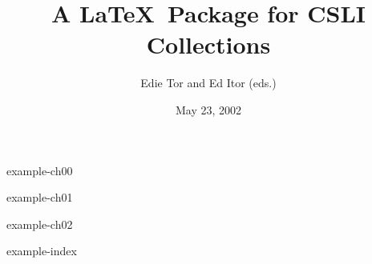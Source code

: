 \documentclass{book}
\title{A \LaTeX\ Package for CSLI Collections}    %
\author{Edie Tor and Ed Itor (eds.)}              %
\date{May 23, 2002}                               %
\begin{document}


\frontmatter      %


\maketitle                %

\setcounter{page}{5}
\setcounter{tocdepth}{0}  %
\tableofcontents          %

 {example-ch00}   %


\mainmatter       %


 {example-ch01}

 {example-ch02}


\backmatter       %


 {example-index}
\end{document}
